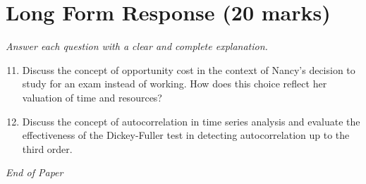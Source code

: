 \documentclass[12pt]{article}
\begin{document}
\section*{Long Form Response (20 marks)}
\textit{Answer each question with a clear and complete explanation.}
\begin{enumerate}[label=\arabic*.]
\setcounter{enumi}{10}
\item Discuss the concept of opportunity cost in the context of Nancy's decision to study for an exam instead of working. How does this choice reflect her valuation of time and resources?
\item Discuss the concept of autocorrelation in time series analysis and evaluate the effectiveness of the Dickey-Fuller test in detecting autocorrelation up to the third order.
\end{enumerate}

\vfill
\noindent\textit{End of Paper}
\end{document}
